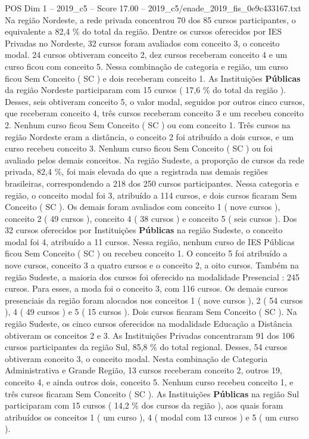 \begin{textsample}{POS Dim 1 – 2019\_c5 – Score 17.00 – 2019\_c5/enade\_2019\_fis\_0e9c433167.txt}
Na região Nordeste, a rede privada concentrou 70 dos 85 cursos participantes, o equivalente a 82,4 \% do total da região.
Dentre os cursos oferecidos por IES Privadas no Nordeste, 32 cursos foram avaliados com conceito 3, o conceito modal. 24 cursos obtiveram conceito 2, dez cursos receberam conceito 4 e um curso ficou com conceito 5.
Nessa combinação de categoria e região, um curso ficou Sem Conceito ( SC ) e dois receberam conceito 1.
As Instituições \textbf{Públicas} da região Nordeste participaram com 15 cursos ( 17,6 \% do total da região ).
Desses, seis obtiveram conceito 5, o valor modal, seguidos por outros cinco cursos, que receberam conceito 4, três cursos receberam conceito 3 e um recebeu conceito 2.
Nenhum curso ficou Sem Conceito ( SC ) ou com conceito 1.
Três cursos na região Nordeste eram a distância, o conceito 2 foi atribuído a dois cursos, e um curso recebeu conceito 3.
Nenhum curso ficou Sem Conceito ( SC ) ou foi avaliado pelos demais conceitos.
Na região Sudeste, a proporção de cursos da rede privada, 82,4 \%, foi mais elevada do que a registrada nas demais regiões brasileiras, correspondendo a 218 dos 250 cursos participantes.
Nessa categoria e região, o conceito modal foi 3, atribuído a 114 cursos, e dois cursos ficaram Sem Conceito ( SC ).
Os demais foram avaliados com conceito 1 ( nove cursos ), conceito 2 ( 49 cursos ), conceito 4 ( 38 cursos ) e conceito 5 ( seis cursos ).
Dos 32 cursos oferecidos por Instituições \textbf{Públicas} na região Sudeste, o conceito modal foi 4, atribuído a 11 cursos.
Nessa região, nenhum curso de IES Públicas ficou Sem Conceito ( SC ) ou recebeu conceito 1.
O conceito 5 foi atribuído a nove cursos, conceito 3 a quatro cursos e o conceito 2, a oito cursos.
Também na região Sudeste, a maioria dos cursos foi oferecido na modalidade Presencial : 245 cursos.
Para esses, a moda foi o conceito 3, com 116 cursos.
Os demais cursos presenciais da região foram alocados nos conceitos 1 ( nove cursos ), 2 ( 54 cursos ), 4 ( 49 cursos ) e 5 ( 15 cursos ).
Dois cursos ficaram Sem Conceito ( SC ).
Na região Sudeste, os cinco cursos oferecidos na modalidade Educação a Distância obtiveram os conceitos 2 e 3.
As Instituições Privadas concentraram 91 dos 106 cursos participantes da região Sul, 85,8 \% do total regional.
Desses, 54 cursos obtiveram conceito 3, o conceito modal.
Nesta combinação de Categoria Administrativa e Grande Região, 13 cursos receberam conceito 2, outros 19, conceito 4, e ainda outros dois, conceito 5.
Nenhum curso recebeu conceito 1, e três cursos ficaram Sem Conceito ( SC ).
As Instituições \textbf{Públicas} na região Sul participaram com 15 cursos ( 14,2 \% dos cursos da região ), aos quais foram atribuídos os conceitos 1 ( um curso ), 4 ( modal com 13 cursos ) e 5 ( um curso ).

\end{textsample}
